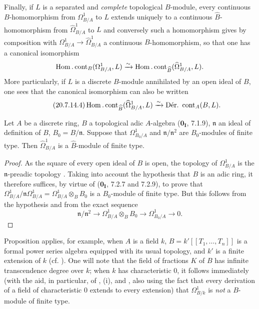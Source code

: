 \begin{env}[20.7.14]
Finally, if $L$ is a separated and \emph{complete} topological $B$-module, every continuous $B$-homomorphism from $\Omega^1_{B/A}$ to $L$ extends uniquely to a continuous $\widehat{B}$-homomorphism from $\widehat{\Omega}^1_{B/A}$ to $L$ and conversely such a homomorphism gives by composition with $\Omega^1_{B/A}\to\widehat{\Omega}^1_{B/A}$ a continuous $B$-homomorphism, so that one has a canonical isomorphism
\[
  \operatorname{Hom}.\operatorname{cont}_B(\Omega^1_{B/A},L)\xrightarrow{\sim}\operatorname{Hom}.\operatorname{cont}_{\widehat{B}}(\widehat{\Omega}^1_{B/A},L).
\]
More particularly, if $L$ is a discrete $B$-module annihilated by an open ideal of $B$, one sees that the canonical isomorphism  can also be written
\begin{equation}
\tag{20.7.14.4}
  \label{0.20.7.14.4}
  \Hom.\operatorname{cont}_{\widehat{B}}(\widehat{\Omega}^1_{B/A},L)\xrightarrow{\sim}\operatorname{D\acute{e}r.\ cont}_A(B,L).
\end{equation}
\end{env}

\begin{proposition}[20.7.15]
\label{0.20.7.15}
Let $A$ be a discrete ring, $B$ a topological adic $A$-algebra ($\mathbf{0_I}$, 7.1.9), $\mathfrak{n}$ an ideal of definition of $B$, $B_0=B/\mathfrak{n}$.
Suppose that $\Omega^1_{B_0/A}$ and $\mathfrak{n}/\mathfrak{n}^2$ are $B_0$-modules of finite type.
Then $\widehat{\Omega}^1_{B/A}$ is a $\widehat{B}$-module of finite type.
\end{proposition}

\begin{proof}
As the square of every open ideal of $B$ is open, the topology of $\Omega^1_{B/A}$ is the $\mathfrak{n}$-preadic topology .
Taking into account the hypothesis that $B$ is an adic ring, it therefore suffices, by virtue of ($\mathbf{0_I}$, 7.2.7 and 7.2.9), to prove
that $\Omega^1_{B/A}/\mathfrak{n}\Omega^1_{B/A}=\Omega^1_{B/A}\otimes_B B_0$ is a $B_0$-module of finite type. But this follows from the hypothesis and from the exact sequence 
\[
  \mathfrak{n}/\mathfrak{n}^2\longrightarrow \Omega^1_{B/A}\otimes_B B_0\longrightarrow \Omega^1_{B_0/A}\longrightarrow 0.
\]
\end{proof}

\begin{env}[20.7.16]
\label{0.20.7.16}
Proposition  applies, for example, when $A$ is a field $k$, $B=k'[[T_1,\ldots,T_n]]$ is a formal power series algebra equipped with its usual topology, and $k'$ is a finite extension of $k$ (cf. ). One will note that the field of fractions $K$ of $B$ has infinite transcendence degree over $k$; when $k$ has characteristic $0$, it follows immediately (with the aid, in particular, of , (i), and , also using the fact that every derivation of a field of characteristic $0$ extends to every extension) that $\Omega^1_{B/k}$ is \emph{not} a $B$-module of finite type.
\end{env}

